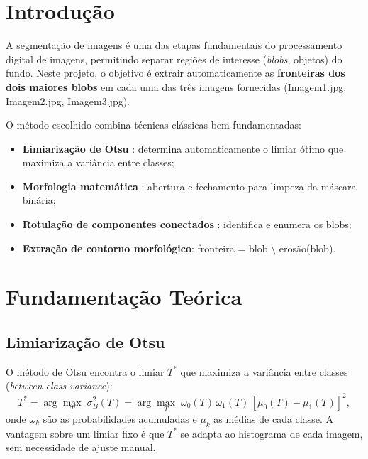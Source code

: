 \documentclass[12pt,a4paper,oneside,brazil,chapter=TITLE,section=TITLE]{abntex2}
\begin{document}
\tableofcontents*
\cleardoublepage
\textual

\chapter{Introdu\c{c}\~ao}

A segmenta\c{c}\~ao de imagens \'e uma das etapas fundamentais do
processamento digital de imagens, permitindo separar regi\~oes de
interesse (\textit{blobs}, objetos) do fundo.
Neste projeto, o objetivo \'e extrair automaticamente as
\textbf{fronteiras dos dois maiores blobs} em cada uma das tr\^es
imagens fornecidas (Imagem1.jpg, Imagem2.jpg, Imagem3.jpg).

O m\'etodo escolhido combina t\'ecnicas cl\'assicas bem fundamentadas:
\begin{itemize}
  \item \textbf{Limiariza\c{c}\~ao de Otsu} \cite{otsu1979}: determina
        automaticamente o limiar \'otimo que maximiza a vari\^ancia entre
        classes;
  \item \textbf{Morfologia matem\'atica} \cite{serra1982}: abertura e
        fechamento para limpeza da m\'ascara bin\'aria;
  \item \textbf{Rotula\c{c}\~ao de componentes conectados}
        \cite{rosenfeld1966}: identifica e enumera os blobs;
  \item \textbf{Extra\c{c}\~ao de contorno morfol\'ogico}: fronteira =
        blob $\setminus$ eros\~ao(blob).
\end{itemize}

\chapter{Fundamenta\c{c}\~ao Te\'orica}

\section{Limiariza\c{c}\~ao de Otsu}

O m\'etodo de Otsu \cite{otsu1979} encontra o limiar $T^*$ que maximiza
a vari\^ancia entre classes (\textit{between-class variance}):
\begin{equation}
  T^* = \arg\max_T \; \sigma_B^2(T)
      = \arg\max_T \; \omega_0(T)\,\omega_1(T)\,[\mu_0(T) - \mu_1(T)]^2,
\end{equation}
onde $\omega_k$ s\~ao as probabilidades acumuladas e $\mu_k$ as m\'edias
de cada classe.
A vantagem sobre um limiar fixo \'e que $T^*$ se adapta ao histograma
de cada imagem, sem necessidade de ajuste manual.
\end{document}
